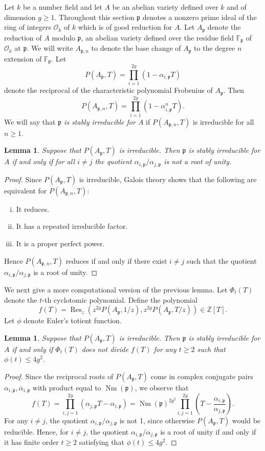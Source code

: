 \documentclass[oneside]{amsart}
\newtheorem{lemma}[theorem]{Lemma}
\theoremstyle{remark}
\newcommand{\Z}{\mathbb Z}
\newcommand{\FF}{\mathbb F}
\newcommand{\p}{\mathfrak{p}}
\newcommand{\Res}{\operatorname{Res}}
\newcommand{\Nm}{\operatorname{Nm}}
\numberwithin{equation}{section}
\begin{document}
Let $k$ be a number field and let $A$ be an abelian variety defined over $k$ and of dimension $g\geq 1$. Throughout this section $\p$ denotes a nonzero prime ideal of the ring of integers $\mathcal O_k$ of $k$ which is of good reduction for $A$. Let $A_{\p}$ denote the reduction of $A$ modulo $\p$, an abelian variety defined over the residue field $\FF_\p$ of $\mathcal O_k$ at $\p$. We will write $A_{\p,n}$ to denote the base change of $A_{\p}$ to the degree $n$ extension of $\FF_{\p}$. Let 
$$
P(A_{\p},T)=\prod_{i=1}^{2g}(1-\alpha_{i,\p}T)
$$ 
denote the reciprocal of the characteristic polynomial Frobenius of $A_{\p}$. Then
$$
P(A_{\p,n},T)=\prod_{i=1}^{2g}(1-\alpha_{i,\p}^nT).
$$
We will say that \emph{$\p$ is stably irreducible for $A$} if $P(A_{\p,n},T)$ is irreducible for all $n\geq 1$.

\begin{lemma}
Suppose that $P(A_{\p},T)$ is irreducible. Then $\p$ is stably irreducible for $A$ if and only if for all $i\not=j$ the quotient $\alpha_{i,\p}/\alpha_{j,\p}$ is not a root of unity. 
\end{lemma}

\begin{proof}
Since $P(A_{\p},T)$ is irreducible, Galois theory shows that the following are equivalent for $P(A_{\p,n},T)$:
\begin{enumerate}[i)]
\item It reduces. 
\item It has a repeated irreducible factor.
\item It is a proper perfect power. 
\end{enumerate}
Hence $P(A_{\p,n},T)$ reduces if and only if there exist $i\not=j$ such that the quotient $\alpha_{i,\p}/\alpha_{j,\p}$ is a root of unity. 
\end{proof}

We next give a more computational version of the previous lemma. Let $\Phi_t(T)$ denote the $t$-th cyclotomic polynomial. Define the polynomial
$$
f(T)=\Res_z(z^{2g}P(A_{\p},1/z),z^{2g}P(A_{\p},T/z))\in \Z[T].
$$
Let $\phi$ denote Euler's totient function. 

\begin{lemma}\label{lemma: stably test}
Suppose that $P(A_{\p},T)$ is irreducible. Then $\p$ is stably irreducible for $A$ if and only if $\Phi_t(T)$ does not divide $f(T)$ for any $t\geq 2$ such that $\phi(t)\leq 4g^2$.
\end{lemma}

\begin{proof}
Since the reciprocal roots of $P(A_\p,T)$ come in complex conjugate pairs $\alpha_{i,\p},\overline \alpha_{i,\p}$ with product equal to $\Nm(\p)$, we observe that
$$
f(T)=\prod_{i,j=1}^{2g}\left( \alpha_{j,\p}T-\alpha_{i,\p}\right)=\Nm(\p)^{2g^2}\prod_{i,j=1}^{2g}\left(T- \frac{\alpha_{i,\p}}{\alpha_{j,\p}}\right).
$$
For any $i\not = j$, the quotient $\alpha_{i,\p}/\alpha_{j,\p}$ is not 1, since otherwise $P(A_{\p},T)$ would be reducible. Hence, for $i\not = j$, the quotient $\alpha_{i,\p}/\alpha_{j,\p}$ is a root of unity if and only if it has finite order $t\geq 2$ satisfying that $\phi(t)\leq 4g^2$. 
\end{proof}
\end{document}

